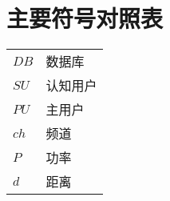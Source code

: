 
\chapter{主要符号对照表}
\label{chap:symb}
\begin{tabular}{ll}

 \hspace{2em}$DB$       & \hspace{5em}数据库 \\
 \hspace{2em}$SU$       & \hspace{5em}认知用户 \\
 \hspace{2em}$PU$ \qquad     & \hspace{5em}主用户 \\
 \hspace{2em}$ch$       & \hspace{5em}频道 \\
 \hspace{2em}$P$ \qquad     & \hspace{5em}功率 \\
 \hspace{2em}$d$       & \hspace{5em}距离 \\




\end{tabular}
